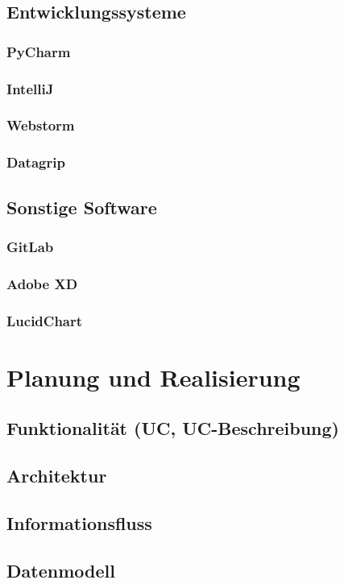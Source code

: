 \documentclass[pdftex,11pt,a4paper]{book}
\begin{document}
\section{Entwicklungssysteme}
\subsection{PyCharm}
\subsection{IntelliJ}
\subsection{Webstorm}
\subsection{Datagrip}
\section{Sonstige Software}
\subsection{GitLab}
\subsection{Adobe XD}
\subsection{LucidChart}

\chapter{Planung und Realisierung}
\section{Funktionalität (UC, UC-Beschreibung)}
\section{Architektur}
\section{Informationsfluss}
\section{Datenmodell}
\end{document}
